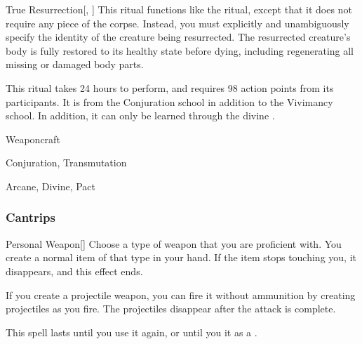 \lowercase{\hypertarget{spell:True Resurrection}{}}\label{spell:True Resurrection}
\begin{apability}[\nth{7}]{\hypertarget{spell:True Resurrection}{True Resurrection}}[, ]
This ritual functions like the  ritual, except that it does not require any piece of the corpse.
Instead, you must explicitly and unambiguously specify the identity of the creature being resurrected.
The resurrected creature's body is fully restored to its healthy state before dying, including regenerating all missing or damaged body parts.

This ritual takes 24 hours to perform, and requires 98 action points from its participants.
It is from the Conjuration school in addition to the Vivimancy school.
In addition, it can only be learned through the divine .
\end{apability}
\vspace{0.25em}


\newpage
\begin{spellsection}{Weaponcraft}

\begin{spellheader}
\end{spellheader}


 Conjuration, Transmutation

 Arcane, Divine, Pact

\subsubsection{Cantrips}


\begin{freeability}{Personal Weapon}[]
Choose a type of weapon that you are proficient with.
You create a normal item of that type in your hand.
If the item stops touching you, it disappears, and this effect ends.

If you create a projectile weapon, you can fire it without ammunition by creating projectiles as you fire.
The projectiles disappear after the attack is complete.

This spell lasts until you use it again, or until you  it as a .
\end{freeability}

\end{spellsection}


